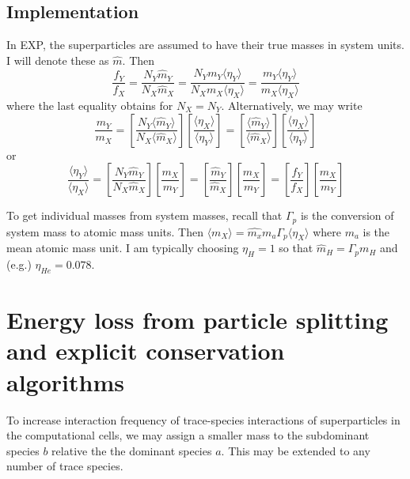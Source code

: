 \documentclass[12pt]{article}
\begin{document}
\subsection{Implementation}

In EXP, the superparticles are assumed to have their true masses in
system units.  I will denote these as $\hat{m}$.  Then
\begin{equation}
  \frac{f_Y}{f_X} = \frac{N_Y {\hat m}_Y}{N_X \hat{m}_X} = \frac{N_Y
    m_Y\langle\eta_Y\rangle}{N_X m_X \langle\eta_X\rangle} = 
  \frac{m_Y\langle\eta_Y\rangle}{m_X \langle\eta_X\rangle}
\end{equation}
where the last equality obtains for $N_X=N_Y$.  Alternatively, 
we may write
\begin{equation}
\frac{m_Y}{m_X} 
= \left[\frac{N_Y\langle\hat{m}_Y\rangle}{N_X\langle\hat{m}_X\rangle}\right]
\left[\frac{\langle\eta_X\rangle}{\langle\eta_Y\rangle}\right]
= \left[\frac{\langle\hat{m}_Y\rangle}{\langle\hat{m}_X\rangle}\right]
\left[\frac{\langle\eta_X\rangle}{\langle\eta_Y\rangle}\right]
\end{equation}
or
\begin{equation}
  \frac{\langle\eta_Y\rangle}{\langle\eta_X\rangle} = 
  \left[\frac{N_Y{\hat m}_Y}{N_X\hat{m}_X}\right]
  \left[\frac{m_X}{m_Y}\right] =
  \left[\frac{{\hat m}_Y}{\hat{m}_X}\right]
  \left[\frac{m_X}{m_Y}\right] =
  \left[\frac{f_Y}{f_X}\right]
  \left[\frac{m_X}{m_Y}\right]
\end{equation}

To get individual masses from system masses, recall that $\Gamma_p$ is
the conversion of system mass to atomic mass units.  Then
$\langle{m}_X\rangle = \hat{m_x}m_a\Gamma_p \langle\eta_X\rangle$
where $m_a$ is the mean atomic mass unit.  I am typically choosing
$\eta_H = 1$ so that $\hat{m}_H = \Gamma_p m_H$ and (e.g.) $\eta_{He}
= 0.078$.

\section{Energy loss from particle splitting and explicit conservation
  algorithms}

To increase interaction frequency of trace-species interactions of
superparticles in the computational cells, we may assign a smaller
mass to the subdominant species $b$ relative the the dominant species
$a$.  This may be extended to any number of trace species.
\end{document}
